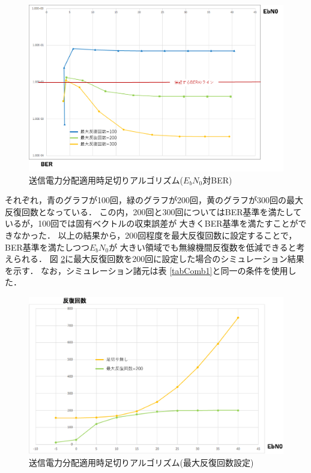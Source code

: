 \begin{figure}[ht]
    \centering
    \includegraphics[width=0.95\linewidth]{chapter4/figure/CombSim3.eps}
    \caption{送信電力分配適用時足切りアルゴリズム($E_bN_0$対BER)}
    \label{figCombSim3}
\end{figure}

それぞれ，青のグラフが100回，緑のグラフが200回，黄のグラフが300回の最大反復回数となっている．
この内，200回と300回についてはBER基準を満たしているが，100回では固有ベクトルの収束誤差が
大きくBER基準を満たすことができなかった．
以上の結果から，200回程度を最大反復回数に設定することで，BER基準を満たしつつ$E_bN_0$が
大きい領域でも無線機間反復数を低減できると考えられる．
図 \ref{figCombSim4}に最大反復回数を200回に設定した場合のシミュレーション結果を示す．
なお，シミュレーション諸元は表 \ref{tabComb1}と同一の条件を使用した．

\begin{figure}[ht]
    \centering
    \includegraphics[width=0.95\linewidth]{chapter4/figure/CombSim4.eps}
    \caption{送信電力分配適用時足切りアルゴリズム(最大反復回数設定)}
    \label{figCombSim4}
\end{figure}

